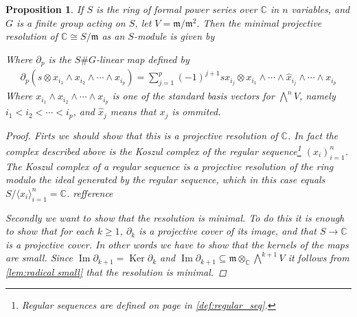 \documentclass[11pt, a4paper, english]{article}
\newtheorem{prop}{Proposition}
\numberwithin{prop}{section}
\numberwithin{lemma}{section}
\numberwithin{theorem}{section}
\numberwithin{defin}{section}
\numberwithin{example}{section}
\newcommand{\C}{\mathbb{C}}
\DeclareMathOperator{\Image}{Im}
\DeclareMathOperator{\Ker}{Ker}
\begin{document}
\begin{prop}
If $S$ is the ring of formal power series over $\C$ in $n$ variables, and $G$ is a finite group acting on $S$, let $V=\mathfrak{m}/\mathfrak{m}^2$. Then the minimal projective resolution of $\C \cong S/\mathfrak{m}$ as an $S$-module is given by
\begin{center}
\end{center}
Where $\partial_p$ is the $S\#G$-linear map defined by
\begin{align*}
\partial_p(s \otimes x_{i_1} \wedge x_{i_2} \wedge \cdots \wedge x_{i_p}) = \sum_{j=1}^{p} (-1)^{j+1} sx_{i_j} \otimes x_{i_1} \wedge \cdots \wedge \hat{x}_{i_{j}} \wedge \cdots \wedge x_{i_{p}} 
\end{align*}
Where $x_{i_1} \wedge x_{i_2} \wedge \cdots \wedge x_{i_p}$ is one of the standard basis vectors for $\bigwedge\limits^n V$, namely $i_1 < i_2 < \cdots < i_p$, and  $\hat{x}_j$ means that $x_j$ is ommited.

\begin{proof}
Firts we should show that this is a projective resolution of $\C$. In fact the complex described above is the Koszul complex of the regular sequence\footnote{Regular sequences are defined on page \pageref{def:regular_seq} in \cref{def:regular_seq}.} $(x_i)_{i=1}^n$. The Koszul complex of a regular sequence is a projective resolution of the ring modulo the ideal generated by the regular sequence, which in this case equals $S/\langle x_i \rangle_{i=1}^n = \C$. {\color{red} refference}

Secondly we want to show that the resolution is minimal. To do this it is enough to show that for each $k \geq 1$, $\partial_k$ is a projective cover of its image, and that $S \to \C$ is a projective cover. In other words we have to show that the kernels of the maps are small. Since $\Image \partial_{k+1} = \Ker \partial_k$ and $\Image \partial_{k+1} \subseteq \mathfrak{m} \otimes_\C \bigwedge\limits^{k+1}V$ it follows from \cref{lem:radical small} that the resolution is minimal.
\end{proof}
\end{prop}
\end{document}
